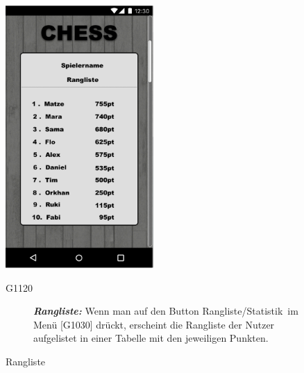 \documentclass[parskip=full]{scrartcl}
\begin{document}
	\begin{figure}[htp]
		\begin{minipage}[t]{6cm}
			\vspace{0pt}
			\includegraphics[height=100mm]{leaderboard.png}
			\caption{Rangliste}
			\label{fig:Rangliste}
		\end{minipage}
		\hfill
		\begin{minipage}[t]{6cm}
			\vspace{0pt}
			\begin{description}
				\item[G1120] \textbf{\textit{Rangliste: }} Wenn man auf den Button \glqq Rangliste/Statistik\grqq\ im Menü [G1030] drückt, erscheint die Rangliste der Nutzer aufgelistet in einer Tabelle mit den jeweiligen Punkten.
			\end{description}
		\end{minipage}
		

\end{figure}
\end{document}
